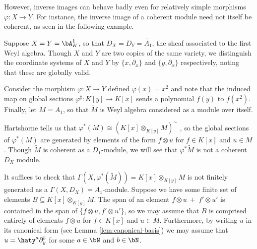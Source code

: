 However, inverse images can behave badly even for relatively simple morphisms $\varphi:X\to Y$. For instance, the inverse image of a coherent module need not itself be coherent, as seen in the following example.
\begin{example}\label{example:pullback-badly-behaved}
	Suppose $X = Y = \bA^1_K$, so that $D_X = D_Y = \tilde{A_1}$, the sheaf associated to the first Weyl algebra. Though $X$ and $Y$ are two copies of the same variety, we distinguish the coordinate systems of $X$ and $Y$ by $\{x,\partial_x\}$ and $\{y,\partial_x\}$ respectively, noting that these are globally valid.
	
	Consider the morphism $\varphi:X\to Y$ defined $\varphi(x) = x^2$ and note that the induced map on global sections $\varphi^{\sharp}:K[y]\to K[x]$ sends a polynomial $f(y)$ to $f(x^2)$. Finally, let $M = A_1$, so that $\tilde{M}$ is Weyl algebra considered as a module over itself.

	Hartshorne tells us that $\varphi^*(M) \cong (K[x] \otimes_{K[y]} M)^\sim$ \cite[Proposition 2.5.2]{hartshorne}, so the global sections of $\varphi^*(M)$ are generated by elements of the form $f\otimes u$ for $f \in K[x]$ and $u \in M$. Though $\tilde{M}$ is coherent as a $D_Y$-module, we will see that $\varphi^*\tilde{M}$ is not a coherent $D_X$ module.

	It suffices to check that $\Gamma(X,\varphi^*(\tilde{M})) = K[x]\otimes_{K[y]} M$ is not finitely generated as a $\Gamma(X,D_X) = A_1$-module. Suppose we have some finite set of elements $B \subseteq K[x]\otimes_{K[y]} M$. The span of an element $f\otimes u ~+~ f'\otimes u'$ is contained in the span of $\{f\otimes u,f'\otimes u'\}$, so we may assume that $B$ is comprised entirely of elements $f\otimes u$ for $f \in K[x]$ and $u \in M$. Furthermore, by writing $u$ in its canonical form (see Lemma \ref{lem:canonical-basis}) we may assume that $u = \haty^a\partial_y^b$ for some $a\in \bN$ and $b \in \bN$.


\end{example}
